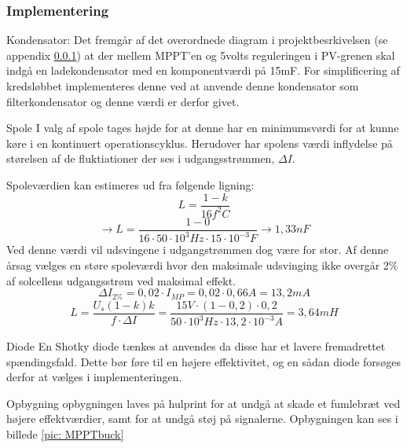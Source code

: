 \documentclass[../main.tex]{subfiles}
\begin{document}
        \subsubsection{Implementering}

            Kondensator:
            Det fremgår af det overordnede diagram i projektbesrkivelsen (se appendix \ref{}) at der mellem MPPT'en og 5volts reguleringen i PV-grenen skal indgå en ladekondensator med en komponentværdi på 15mF. For simplificering af kredsløbbet implementeres denne ved at anvende denne kondensator som filterkondensator og denne værdi er derfor givet.
            
            Spole
            I valg af spole tages højde for at denne har en minimumsvørdi for at kunne køre i en kontinuert operationscyklus. Herudover har spolens værdi inflydelse på størelsen af de fluktiationer der ses i udgangsstrømmen, $\Delta I$.\newline

            Spoleværdien kan estimeres ud fra følgende ligning:
            $$L = \frac{1-k}{16 f^2 C}$$
            $$\rightarrow L = \frac{1-0}{16\cdot 50\cdot 10^3 Hz \cdot 15\cdot 10^{-3}F} \rightarrow 1,33nF$$
            \newline
            Ved denne værdi vil udsvingene i udgangstrømmen dog være for stor. Af denne årsag vælges en støre spoleværdi hvor den maksimale udsvinging ikke overgår 2\% af solcellens udgangsstrøm ved maksimal effekt.
            $$\Delta I_{2\%} = 0,02 \cdot I_{MP} = 0,02 \cdot 0,66A = 13,2mA$$
            $$L = \frac{U_s(1-k)k}{f\cdot \Delta I} = \frac{15 V\cdot (1-0,2)\cdot 0,2}{50\cdot 10^3 Hz \cdot 13,2 \cdot 10^{-3} A} = 3,64mH$$\newline
            
            
            Diode
            En Shotky diode tænkes at anvendes da disse har et lavere fremadrettet spændingsfald. Dette bør føre til en højere effektivitet, og en sådan diode forsøges derfor at vælges i implementeringen.

            Opbygning
            opbygningen laves på hulprint for at undgå at skade et fumlebræt ved højere effektværdier, samt for at undgå støj på signalerne. Opbygningen kan ses i billede \ref{pic: MPPTbuck}
\end{document}
